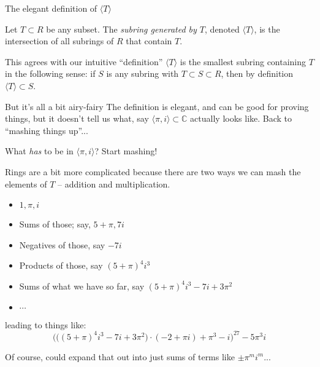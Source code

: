 \documentclass{beamer}
\begin{document}
\begin{frame}{The elegant definition of $\langle T\rangle$}

\begin{definition} Let $T\subset R$ be any subset.  The \emph{subring generated by $T$}, denoted $\langle T\rangle$, is the intersection of all subrings of $R$ that contain $T$.
\end{definition}

\begin{block}{This agrees with our intuitive ``definition''}
$\langle T\rangle $ is the smallest subring containing $T$ in the following sense: if $S$ is any subring with $T\subset S\subset R$, then by definition $\langle T\rangle \subset S$.
\end{block}

\begin{block}{But it's all a bit airy-fairy}
The definition is elegant, and can be good for proving things, but it doesn't tell us what, say $\langle \pi, i \rangle \subset \mathbb{C}$ actually looks like.  Back to ``mashing things up''...
\end{block}


\end{frame}


\begin{frame}{What \emph{has} to be in $\langle \pi, i \rangle $?  Start mashing!}

Rings are a bit more complicated because there are two ways we can mash the elements of $T$ -- addition and multiplication.

\begin{itemize}
\item $1, \pi, i$
\item Sums of those; say, $5+\pi, 7i$
\item Negatives of those, say $-7i$ 
\item Products of those, say $(5+\pi)^4 i^3$
\item Sums of what we have so far, say $(5+\pi)^4i^3-7i+3\pi^2$
\item $\cdots$
\end{itemize}
leading to things like:
$$\Big(\big((5+\pi)^4i^3-7i+3\pi^2\big)\cdot (-2+\pi i)+\pi^3-i\Big)^{27}-5\pi^3i$$

Of course, could expand that out into just sums of terms like $\pm\pi^m i^m$...

\end{frame}
\end{document}
